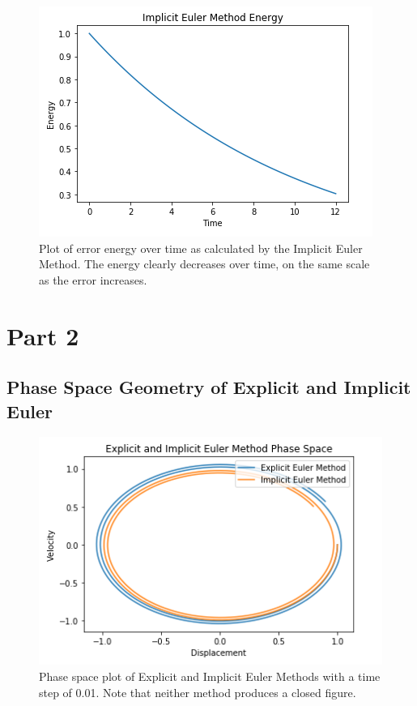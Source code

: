 \documentclass{article}
\begin{document}
\begin{figure}[h!]
\centering
\includegraphics[scale=0.35]{imp_euler_energy.png}
\caption{Plot of error energy over time as calculated by the Implicit Euler Method. The energy clearly decreases over time, on the same scale as the error increases.}
\label{fig:impeulerenergy}
\end{figure}

\break

\section{Part 2}


\subsection{Phase Space Geometry of Explicit and Implicit Euler}

\begin{figure}[h!]
\centering
\includegraphics[scale=0.35]{exp_imp_phase.png}
\caption{Phase space plot of Explicit and Implicit Euler Methods with a time step of 0.01. Note that neither method produces a closed figure.}
\label{fig:expimpphase}
\end{figure}
\end{document}
